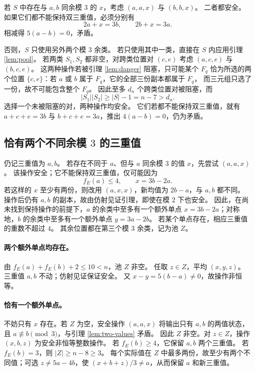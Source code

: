 \documentclass[UTF8,fontset=fandol,zihao=-4,a4paper]{ctexart}
\numberwithin{equation}{section}
\theoremstyle{definition}
\begin{document}
若 $S$ 中存在与 $a,b$ 同余模 $3$ 的 $x$，考虑 $(a,a,x)$ 与 $(b,b,x)$。
二者都安全。如果它们都不能保持双三重值，必须分别有
\[
 2a+x=3b,\qquad 2b+x=3a.
\]
相减得 $5(a-b)=0$，矛盾。

否则，$S$ 只使用另外两个模 $3$ 余类。
若只使用其中一类，直接在 $S$ 内应用引理 \ref{lem:pool}。
若两类 $S_1,S_2$ 都非空，对跨类位置对 $(c,e)$ 考虑
$(a,c,e)$ 与 $(b,c,e)$。
这两种操作若被引理 \ref{lem:danger} 阻塞，只可能某个 $F_q$ 恰为所选的两个位置
$\{c,e\}$：若 $a$ 或 $b$ 属于 $F_q$，它的全部三份副本都属于 $F_q$，
而三元组只选了一份，故不可能包含整个 $F_q$。
因此至多 $d_n$ 个跨类位置对被阻塞，而
\[
 |S_1||S_2|\ge |S|-1=n-7>d_n.
\]
选择一个未被阻塞的对，两种操作均安全。
它们若都不能保持双三重值，就有
$a+c+e=3b$ 与 $b+c+e=3a$，推出 $4(a-b)=0$，仍为矛盾。

\subsection{恰有两个不同余模 \texorpdfstring{$3$}{3} 的三重值}

仍记三重值为 $a,b$。
若存在不同于 $a$、但与 $a$ 同余模 $3$ 的值 $x$，先尝试 $(a,a,x)$。
该操作安全；它不能保持双三重值，仅可能因为
\begin{equation}\label{eq:affine-neighbor}
 f_E(a)\le4,\qquad x=3b-2a.
\end{equation}
若这样的 $x$ 至少有两份，则改用 $(a,x,x)$，新均值为 $2b-a$，与 $a,b$ 都不同。
操作后仍有 $a,b$ 的副本，故由仿射见证引理，即使在模 $2$ 下也安全。
因此，在尚未找到保持操作的前提下，$a$ 的余类中至多有一个额外单点
$x=3b-2a$；对称地，$b$ 的余类中至多有一个额外单点 $y=3a-2b$。
若某个单点存在，相应三重值的重数不超过 $4$。
其余位置都在第三个模 $3$ 余类，记为池 $Z$。

\paragraph{两个额外单点均存在。}
由 $f_E(a)+f_E(b)+2\le10<n$，池 $Z$ 非空。
任取 $z\in Z$，平均 $(x,y,z)$。三重值 $a,b$ 不动；仿射见证保证安全。
又 $x-y=5(b-a)\ne0$，故操作非恒等。

\paragraph{恰有一个额外单点。}
不妨只有 $x$ 存在。若 $Z$ 为空，安全操作 $(a,a,x)$ 将输出只有 $a,b$ 的两值状态，
且 $a\not\equiv b\pmod3$，与引理 \ref{lem:two-values} 矛盾。
因此 $Z$ 非空。对 $z\in Z$，操作 $(x,b,z)$ 为安全非恒等整数操作。
若 $f_E(b)\ge4$，它保留 $a,b$ 两个三重值。
若 $f_E(b)=3$，则 $|Z|\ge n-8\ge3$。
每个实际值在 $Z$ 中最多两份，故至少有两个不同值；可选
$z\ne5a-4b$，使 $(x+b+z)/3\ne a$，从而保留 $a$ 和新三重值。
\end{document}

